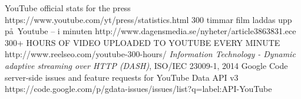 \begin{thebibliography}{2}
		YouTube official stats for the press
		https://www.youtube.com/yt/press/statistics.html
		300 timmar film laddas upp p\aa\  Youtube – i minuten
		http://www.dagensmedia.se/nyheter/article3863831.ece
		300+ HOURS OF VIDEO UPLOADED TO YOUTUBE EVERY MINUTE
		http://www.reelseo.com/youtube-300-hours/
		\textit{Information Technology - Dynamic adaptive streaming over HTTP (DASH)},
		ISO/IEC 23009-1, 2014
		Google Code server-side issues and feature requests for YouTube Data API v3
		https://code.google.com/p/gdata-issues/issues/list?q=label:API-YouTube
\end{thebibliography}
